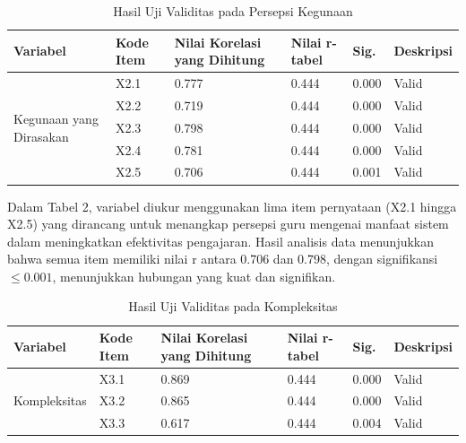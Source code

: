     \begin{table}[H]
        \centering
        \caption{Hasil Uji Validitas pada Persepsi Kegunaan}
        \label{tab:uji-validitas-kegunaan}
        \begin{tabularx}{\textwidth}{p{4.5cm}lXXXl}
            \toprule
            \textbf{Variabel} & \textbf{Kode Item} & \textbf{Nilai Korelasi yang Dihitung} & \textbf{Nilai r-tabel} & \textbf{Sig.} & \textbf{Deskripsi} \\
            \midrule
            \multirow{5}{=}{Kegunaan yang Dirasakan}
                & X2.1 & 0.777 & 0.444 & 0.000 & Valid \\
                & X2.2 & 0.719 & 0.444 & 0.000 & Valid \\
                & X2.3 & 0.798 & 0.444 & 0.000 & Valid \\
                & X2.4 & 0.781 & 0.444 & 0.000 & Valid \\
                & X2.5 & 0.706 & 0.444 & 0.001 & Valid \\
            \bottomrule
        \end{tabularx}
    \end{table}

    Dalam Tabel 2, variabel diukur menggunakan lima item pernyataan (X2.1 hingga X2.5) yang dirancang untuk menangkap persepsi guru mengenai manfaat sistem dalam meningkatkan efektivitas pengajaran. Hasil analisis data menunjukkan bahwa semua item memiliki nilai r antara 0.706 dan 0.798, dengan signifikansi $\leq 0.001$, menunjukkan hubungan yang kuat dan signifikan.

    \begin{table}[H]     \centering
        \caption{Hasil Uji Validitas pada Kompleksitas}
        \label{tab:uji-validitas-kompleksitas}
        \begin{tabularx}{\textwidth}{p{4.5cm}lXXXl}
            \toprule
            \textbf{Variabel} & \textbf{Kode Item} & \textbf{Nilai Korelasi yang Dihitung} & \textbf{Nilai r-tabel} & \textbf{Sig.} & \textbf{Deskripsi} \\
            \midrule
            \multirow{3}{=}{Kompleksitas}
                & X3.1 & 0.869 & 0.444 & 0.000 & Valid \\
                & X3.2 & 0.865 & 0.444 & 0.000 & Valid \\
                & X3.3 & 0.617 & 0.444 & 0.004 & Valid \\
            \bottomrule
        \end{tabularx}
    \end{table}

